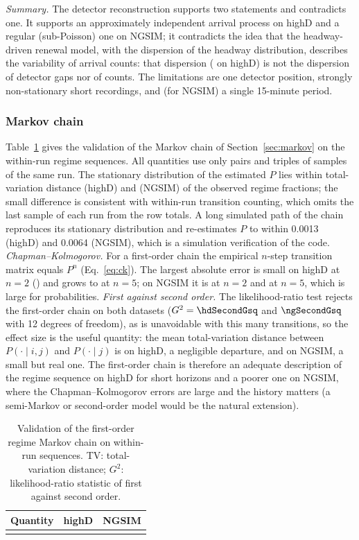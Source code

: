 \documentclass[11pt,a4paper]{article}
\numberwithin{equation}{section}
\begin{document}
\emph{Summary.} The detector reconstruction supports two statements and contradicts one. It supports an approximately independent arrival process on highD and a regular (sub-Poisson) one on NGSIM; it contradicts the idea that the headway-driven renewal model, with the dispersion of the headway distribution, describes the variability of arrival counts: that dispersion
(\hdCV{} on highD) is not the dispersion of detector gaps nor of counts. The limitations are one detector position, strongly non-stationary short recordings, and (for NGSIM) a single 15-minute period.

\subsubsection{Markov chain}
Table~\ref{tab:markovval} gives the validation of the Markov chain of Section~\ref{sec:markov} on the within-run regime sequences. All quantities use only pairs and triples of samples of the same run. The stationary distribution of the estimated $P$ lies within total-variation distance \hdStatTV{} (highD) and \ngStatTV{} (NGSIM) of the observed regime fractions; the small difference is consistent with within-run transition counting, which omits the last sample of each run from the row totals. A long simulated path of the chain reproduces its stationary distribution and re-estimates $P$ to within 0.0013 (highD) and 0.0064 (NGSIM), which is a simulation verification of the code.
\emph{Chapman--Kolmogorov.} For a first-order chain the empirical $n$-step transition matrix equals $P^n$ (Eq.~\eqref{eq:ck}). The largest absolute error is small on highD at $n=2$ (\hdCKtwo) and grows to \hdCKfive{} at $n=5$; on NGSIM it is \ngCKtwo{} at $n=2$ and \ngCKfive{} at $n=5$, which is large for probabilities.
\emph{First against second order.} The likelihood-ratio test rejects the first-order chain on both datasets ($G^2=\hdSecondGsq$ and $\ngSecondGsq$ with 12 degrees of freedom), as is unavoidable with this many transitions, so the effect size is the useful quantity: the mean total-variation distance between $P(\cdot\mid i,j)$ and $P(\cdot\mid j)$ is
\hdSecondTV{} on highD, a negligible departure, and \ngSecondTV{} on NGSIM, a small but real one. The first-order chain is therefore an adequate description of the regime sequence on highD for short horizons and a poorer one on NGSIM, where the Chapman--Kolmogorov errors are large and the history matters (a semi-Markov or second-order model would be the natural extension).
\begin{table}[H]
\centering\small
\caption{Validation of the first-order regime Markov chain on within-run sequences. TV: total-variation distance; $G^2$: likelihood-ratio statistic of first against second order.}
\label{tab:markovval}
\begin{tabular}{@{}lrr@{}}
\toprule
Quantity & highD & NGSIM \\
\midrule
\\
\bottomrule
\end{tabular}
\end{table}
\end{document}
